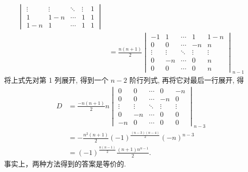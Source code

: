 \documentclass[UTF8,12pt,a4paper,fontset=fandol]{ctexart}
\begin{document}
\begin{solve}
\begin{enumerate}
\begin{enumerate}
\begin{align*}
\begin{vmatrix}
                                        \vdots & \vdots & \ddots & \vdots & 1   \\
                                        1      & 1-n    & \cdots & 1      & 1   \\
                                        1-n    & 1      & \cdots & 1      & 1
                                    \end{vmatrix}                         \\
                                      & =\frac{n(n+1)}{2}\begin{vmatrix}
                                                             -1     & 1      & \cdots & 1      & 1-n    \\
                                                             0      & 0      & \cdots & -n     & n      \\
                                                             \vdots & \vdots & \ddots & \vdots & \vdots \\
                                                             0      & -n     & \cdots & 0      & n      \\
                                                             0      & 0      & \cdots & 0      & n
                                                         \end{vmatrix}_{n-1}
                                \end{align*}
                                将上式先对第 1 列展开, 得到一个 $n-2$ 阶行列式, 再将它对最后一行展开, 得
                                \begin{align*}
                                    D & =\frac{-n(n+1)}{2} n
                                    \begin{vmatrix}
                                        0      & 0      & \cdots & 0      & -n     \\
                                        0      & 0      & \cdots & -n     & 0      \\
                                        \vdots & \vdots & \ddots & \vdots & \vdots \\
                                        0      & -n     & \cdots & 0      & 0      \\
                                        -n     & 0      & \cdots & 0      & 0
                                    \end{vmatrix}_{n-3}                      \\
                                      & =-\frac{n^{2}(n+1)}{2}(-1)^{\frac{(n-3)(n-4)}{2}}(-n)^{n-3} \\
                                      & =(-1)^{\frac{n(n-1)}{2} }\frac{(n+1) n^{n-1}}{2}.
                                \end{align*}
                                事实上，两种方法得到的答案是等价的.
                      \end{enumerate}
            \end{enumerate}
\end{solve}
\end{document}
